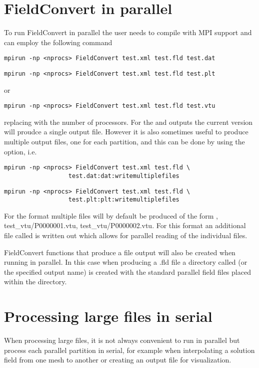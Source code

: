 \section{FieldConvert in parallel}
To run FieldConvert in parallel the user needs to compile
\nekpp with MPI support and can employ the following
command
\begin{lstlisting}[style=BashInputStyle]
mpirun -np <nprocs> FieldConvert test.xml test.fld test.dat
\end{lstlisting}
\begin{lstlisting}[style=BashInputStyle]
mpirun -np <nprocs> FieldConvert test.xml test.fld test.plt
\end{lstlisting}
or
\begin{lstlisting}[style=BashInputStyle]
mpirun -np <nprocs> FieldConvert test.xml test.fld test.vtu
\end{lstlisting}
replacing  with the number of processors. For the
 and  outputs the current version will proudce
a single output file.  However it is also sometimes useful to produce
multiple output files, one for each partition, and this
can be done by using the  option, i.e.
\begin{lstlisting}[style=BashInputStyle]
  mpirun -np <nprocs> FieldConvert test.xml test.fld \
                  test.dat:dat:writemultiplefiles
\end{lstlisting}
\begin{lstlisting}[style=BashInputStyle]
  mpirun -np <nprocs> FieldConvert test.xml test.fld \
                  test.plt:plt:writemultiplefiles
\end{lstlisting}

For the  format multiple files will by default be produced
of the form , {test\_vtu/P0000001.vtu},
{test\_vtu/P0000002.vtu}. For this format an additional file called
\inltt{test.pvtu} is written out which allows for parallel reading of the
individual \inltt{.vtu} files.

FieldConvert functions that produce a  file output will
also be created when running in parallel. In this case when producing
a .fld file a directory called \inltt{test.fld} (or the specified
output name) is created with the standard parallel field files placed
within the directory.
%
%
%
\section{Processing large files in serial}
When processing large files, it is not always convenient to run in parallel but
process each parallel partition in serial, for example when interpolating a
solution field from one mesh to another or creating an output file for
visualization.


